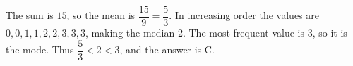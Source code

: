 The sum is $15$, so the mean is $\dfrac{15}{9}=\dfrac{5}{3}$. In increasing order the values are $0,0,1,1,2,2,3,3,3$, making the median $2$. The most frequent value is $3$, so it is the mode. Thus $\dfrac{5}{3}<2<3$, and the answer is $\boxed{\text{C}}$.
